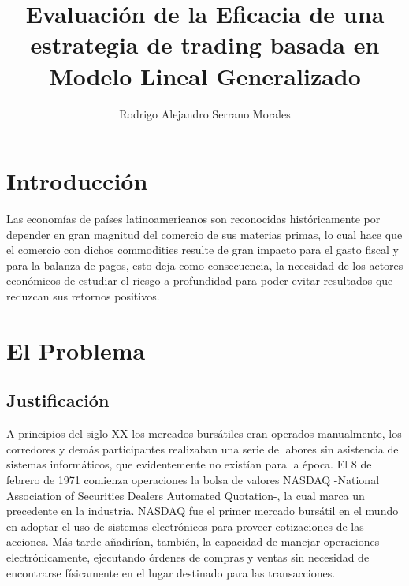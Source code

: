 \documentclass[a4paper,12pt]{Latex/Classes/PhDthesisPSnPDF}
\title{Evaluación de la Eficacia de una estrategia de trading basada en Modelo Lineal Generalizado}
\author{Rodrigo Alejandro Serrano Morales}
\begin{document}


\maketitle									%

\newpage\renewcommand{\thepage}{\arabic{page}}\setcounter{page}{1} 


\tableofcontents
\listoffigures
\listoftables



\chapter*{Introducción}

Las economías de países latinoamericanos son reconocidas históricamente por depender en gran magnitud del comercio de sus materias primas, lo cual hace que el comercio con dichos commodities resulte de gran impacto para el gasto fiscal y para la balanza de pagos, esto deja como consecuencia, la necesidad de los actores económicos de estudiar el riesgo a profundidad para poder evitar resultados que reduzcan sus retornos positivos.\\ 


\chapter{El Problema}

\section{Justificación}

A principios del siglo XX los mercados bursátiles eran operados manualmente, los corredores y demás participantes realizaban una serie de labores sin asistencia de sistemas informáticos, que evidentemente no existían para la época. El 8 de febrero de 1971 comienza operaciones la bolsa de valores NASDAQ -National Association of Securities Dealers Automated Quotation-, la cual marca un precedente en la industria. NASDAQ fue el primer mercado bursátil en el mundo en adoptar el uso de sistemas electrónicos para proveer cotizaciones de las acciones. Más tarde añadirían, también, la capacidad de manejar operaciones electrónicamente, ejecutando órdenes de compras y ventas sin necesidad de encontrarse físicamente en el lugar destinado para las transacciones.
\end{document}
